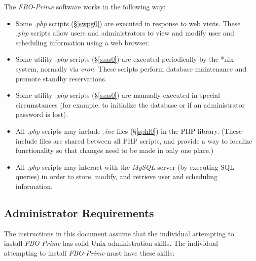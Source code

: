 \documentclass[letterpaper,10pt,titlepage]{article}
\newcommand{\productbasename}{FBO-Prime}
\begin{document}
The \emph{\productbasename{}} software works in the following way:

\begin{itemize}
\item Some \emph{.php} scripts 
      (\S{}\ref{swpg0})
      are executed in response to web
      visits.  These \emph{.php} scripts allow users and
      administrators to view and modify user and scheduling
      information using a web browser.
\item Some utility \emph{.php} scripts 
      (\S{}\ref{ssas0})
      are executed periodically
      by the *nix system, normally via \emph{cron}.  
      These scripts perform database maintenance
      and promote standby reservations.
\item Some utility \emph{.php} scripts 
      (\S{}\ref{ssas0})
      are manually executed in special
      circumstances (for example, to
      initialize the database or if an administrator password is lost).
\item All \emph{.php} scripts may include \emph{.inc} files
      (\S{}\ref{sphl0})
      in the PHP library.  (These include files are shared
      between all PHP scripts, and provide a way to localize functionality
      so that changes need to be made in only one place.)
\item All \emph{.php} scripts may interact with the 
      \emph{MySQL} server (by executing SQL queries)
      in order to store, modify, and retrieve user and scheduling
      information.
\end{itemize}


\subsection{Administrator Requirements}
\label{sins0:sarq0}

The instructions in this document assume that the individual attempting to install
\emph{\productbasename{}} has solid Unix administration skills.  The individual
attempting to install \emph{\productbasename{}} must have these skills:
\end{document}
